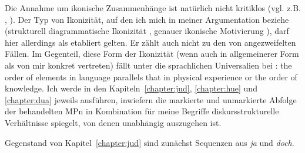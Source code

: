 Die Annahme um ikonische Zusammenhänge ist natürlich nicht kritiklos (vgl. z.B. \citealt{Haiman1983}, \citealt{Haspelmath2008a, Haspelmath2008b}). Der Typ von Ikonizität, auf den ich mich in meiner Argumentation beziehe (strukturell diagrammatische Ikonizität , genauer ikonische Motivierung ), darf hier allerdings als etabliert gelten. Er zählt auch nicht zu den von \citet{Haspelmath2008a} angezweifelten Fällen. Im Gegenteil, diese Form der Ikonizität (wenn auch in allgemeinerer Form als von mir konkret vertre\-ten) fällt unter die sprachlichen Universalien  bei \citet[103]{Greenberg1963}: \glqq the order of elements in language parallels that in physical experience or the order of know\-ledge\grqq{}. Ich werde in den Kapiteln~\ref{chapter:jud}, \ref{chapter:hue} und \ref{chapter:dua} jeweils ausführen, inwiefern die markierte und unmarkierte Abfolge der behandelten MPn in Kombination für meine Begriffe diskursstrukturelle Verhältnisse spiegelt, von denen unabhängig auszugehen ist.  
 
Gegenstand von Kapitel~\ref{chapter:jud} sind zunächst Sequenzen aus \textit{ja} und \textit{doch}.









